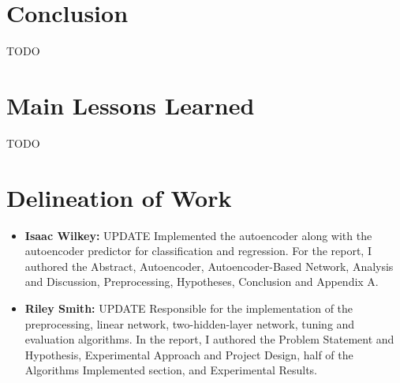 \documentclass[twoside,11pt]{article}
\begin{document}
\section{Conclusion}
TODO



\newpage

\appendix
\section{Main Lessons Learned}
TODO

\section{Delineation of Work}
\begin{itemize}
    \item \textbf{Isaac Wilkey:} UPDATE Implemented the autoencoder along with the autoencoder predictor for classification and regression. For the report, I authored the Abstract, Autoencoder, Autoencoder-Based Network, Analysis and Discussion, Preprocessing, Hypotheses, Conclusion and Appendix A. 
    \item \textbf{Riley Smith:} UPDATE Responsible for the implementation of the preprocessing, linear network, two-hidden-layer network, tuning and evaluation algorithms. In the report, I authored the Problem Statement and Hypothesis, Experimental Approach and Project Design, half of the Algorithms Implemented section, and Experimental Results.
\end{itemize}
\end{document}

